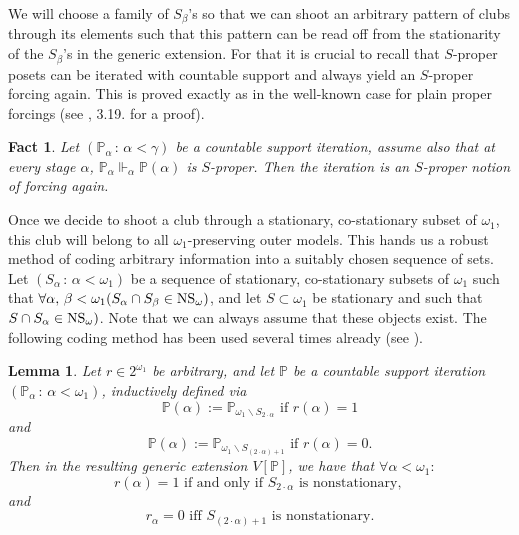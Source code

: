 \documentclass[a4paper,11pt]{article}
\newtheorem{lemma}[theorem]{Lemma}
\newtheorem{fact}[theorem]{Fact}
\newcommand{\forceP}{\mathbb{P}}
\begin{document}
We will choose a family of $S_{\beta}$'s so that we can shoot an arbitrary pattern of clubs through its elements such that this pattern can be read off
from the stationarity of the $S_{\beta}$'s in the generic extension.
For that it is crucial to recall that $S$-proper posets can be iterated with countable support and always yield an $S$-proper forcing again. This is proved exactly as in the well-known case for plain proper forcings (see \cite{Goldstern}, 3.19. for a proof).
\begin{fact}
Let $(\forceP_{\alpha} \,:\, \alpha< \gamma)$ be a countable support iteration, assume also that at every stage $\alpha$, $\forceP_{\alpha} \Vdash_{\alpha} \forceP(\alpha)$ is $S$-proper. Then the iteration is an $S$-proper notion of forcing again.
\end{fact}
Once we decide to shoot a club through a stationary, co-stationary subset of $\omega_1$, this club will belong to all $\omega_1$-preserving outer models. This hands us a robust method of coding arbitrary information into a suitably chosen sequence of sets. Let $(S_{ \alpha} \, : \, \alpha < \omega_1)$ be a sequence of stationary, co-stationary subsets of $\omega_1$ such that $\forall \alpha, \, \beta < \omega_1 (S_{\alpha} \cap S_{\beta} \in \hbox{NS}_{\omega})$, and let $S\subset \omega_1$ be stationary and such that $S \cap S_{\alpha} \in \hbox{NS}_{\omega})$. Note that we can always assume that these objects exist.
The following coding method has been used several times already (see \cite{SyVera}).
\begin{lemma}
 Let $r \in 2^{\omega_1}$ be arbitrary, and let $\forceP$ be a countable support iteration $(\forceP_{\alpha} \, : \, \alpha < \omega_1)$, inductively defined via \[\forceP(\alpha) := \forceP_{\omega_1 \backslash S_{2 \cdot \alpha}} \text{ if } r(\alpha)=1 \] and
 \[\forceP({\alpha}) := \forceP_{\omega_1 \backslash S_{(2 \cdot\alpha) +1}} \text{ if } r(\alpha)=0.\]
 Then in the resulting generic extension $V[\forceP]$, we have that $\forall \alpha < \omega_1:$ \[ r(\alpha)=1 \text{ if and only if }
 S_{2 \cdot \alpha} \text{  is nonstationary, }\]  and \[ r_{\alpha}=0 \text{ iff } S_{(2 \cdot \alpha)+1} \text{ is nonstationary.} \]
\end{lemma}
\end{document}
